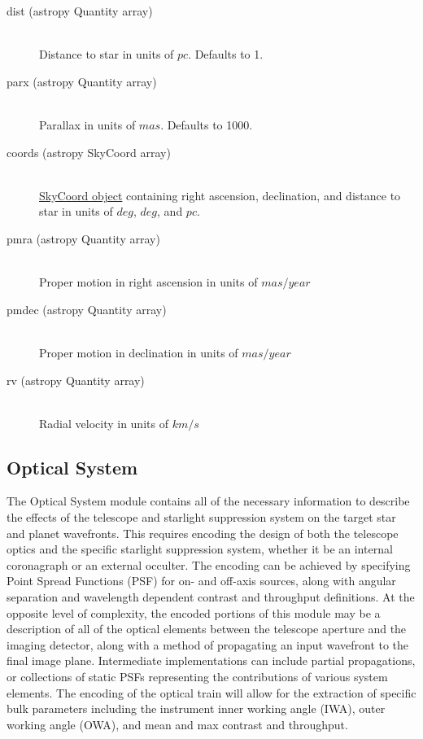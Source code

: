 \documentclass[cleanfoot]{asme2ej}
\begin{document}
\begin{itemize}
\begin{description}
        \item[dist (astropy Quantity array)] \hfill \\
        Distance to star in units of $ pc $. Defaults to 1.
        \item[parx (astropy Quantity array)] \hfill \\
        Parallax in units of $ mas $. Defaults to 1000.
        \item[coords (astropy SkyCoord array)] \hfill \\
        \href{http://astropy.readthedocs.org/en/latest/api/astropy.coordinates.SkyCoord.html}{SkyCoord object} containing right ascension, declination, and distance to star in units of $ deg $, $ deg $, and $ pc $.
        \item[pmra (astropy Quantity array)] \hfill \\
        Proper motion in right ascension in units of $ mas/year $
        \item[pmdec (astropy Quantity array)] \hfill \\
        Proper motion in declination in units of $ mas/year $
        \item[rv (astropy Quantity array)] \hfill \\
        Radial velocity in units of $ km/s $
    \end{description}
\end{itemize}

\subsection{Optical System}
The Optical System module contains all of the necessary information to describe the effects of the telescope and starlight suppression system on the target star and planet wavefronts.  This requires encoding the design of both the telescope optics and the specific starlight suppression system, whether it be an internal coronagraph or an external occulter.  The encoding can be achieved by specifying Point Spread Functions (PSF) for on- and off-axis sources, along with angular separation and wavelength dependent contrast and throughput definitions.  At the opposite level of complexity, the encoded portions of this module may be a description of all of the optical elements between the telescope aperture and the imaging detector, along with a method of propagating an input wavefront to the final image plane.  Intermediate implementations can include partial propagations, or collections of static PSFs representing the contributions of various system elements.  The encoding of the optical train will allow for the extraction of specific bulk parameters including the instrument inner working angle (IWA), outer working angle (OWA), and mean and max contrast and throughput.
\end{document}

